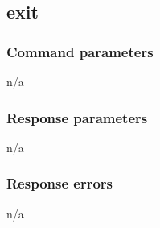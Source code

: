 \subsection{exit}

\subsubsection{Command parameters}

n/a

\subsubsection{Response parameters}

n/a

\subsubsection{Response errors}

n/a
